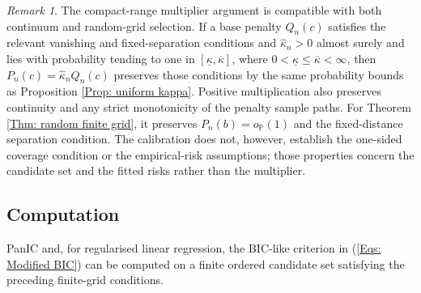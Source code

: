 \documentclass[12pt]{article}
\newenvironment{bluechange}{\begingroup\color[rgb]{0.00,0.00,1.00}}{\endgroup}
\theoremstyle{remark}
\newtheorem{remark}{Remark}
\theoremstyle{plain}
\begin{document}
\begin{bluechange}
\begin{remark}\label{Rem: multiplier continuum random grid}
The compact-range multiplier argument is compatible with both continuum and random-grid selection. If a base penalty $Q_n(c)$ satisfies the relevant vanishing and fixed-separation conditions and $\widehat\kappa_n>0$ almost surely and lies with probability tending to one in $[\underline\kappa,\overline\kappa]$, where $0<\underline\kappa\le\overline\kappa<\infty$, then $P_n(c)=\widehat\kappa_nQ_n(c)$ preserves those conditions by the same probability bounds as Proposition \ref{Prop: uniform kappa}. Positive multiplication also preserves continuity and any strict monotonicity of the penalty sample paths. For Theorem \ref{Thm: random finite grid}, it preserves $P_n(b)=o_{\mathbb P}(1)$ and the fixed-distance separation condition. The calibration does not, however, establish the one-sided coverage condition or the empirical-risk assumptions; those properties concern the candidate set and the fitted risks rather than the multiplier.
\end{remark}
\end{bluechange}

\subsection{Computation}
\label{Sect: Computations}

PanIC and, for regularised linear regression, the BIC-like criterion in (\ref{Eqs: Modified BIC}) can be computed on a finite ordered candidate set satisfying the preceding finite-grid conditions.
\end{document}
